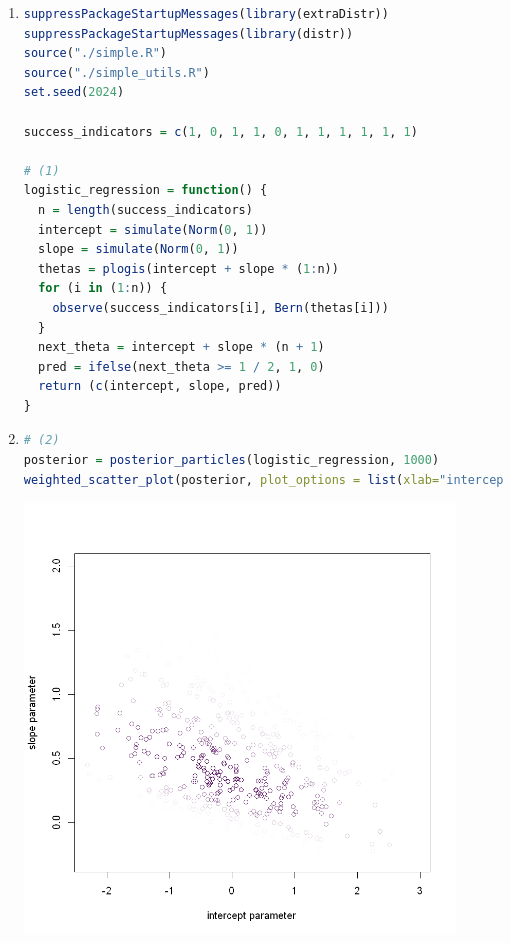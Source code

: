 \documentclass{article}
\begin{document}



\begin{enumerate}
\item 
\begin{lstlisting}[language=R]
suppressPackageStartupMessages(library(extraDistr))
suppressPackageStartupMessages(library(distr))
source("./simple.R")
source("./simple_utils.R")
set.seed(2024)

success_indicators = c(1, 0, 1, 1, 0, 1, 1, 1, 1, 1, 1)

# (1)
logistic_regression = function() {
  n = length(success_indicators)
  intercept = simulate(Norm(0, 1))
  slope = simulate(Norm(0, 1))
  thetas = plogis(intercept + slope * (1:n))
  for (i in (1:n)) {
    observe(success_indicators[i], Bern(thetas[i]))
  }
  next_theta = intercept + slope * (n + 1)
  pred = ifelse(next_theta >= 1 / 2, 1, 0)
  return (c(intercept, slope, pred))
}
\end{lstlisting}



\item \begin{lstlisting}[language=R]
# (2)
posterior = posterior_particles(logistic_regression, 1000)
weighted_scatter_plot(posterior, plot_options = list(xlab="intercept parameter", ylab="slope parameter"))
\end{lstlisting}
\includegraphics[width=0.9\textwidth]{int_slope.png}




\end{enumerate}
\end{document}
